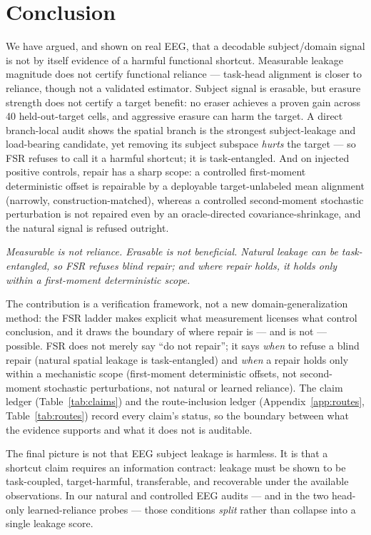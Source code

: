 \section{Conclusion}
\label{sec:conclusion}

We have argued, and shown on real EEG, that a decodable subject/domain signal is not by itself evidence
of a harmful functional shortcut. Measurable leakage magnitude does not certify functional reliance ---
task-head alignment is closer to reliance, though not a validated estimator. Subject signal is erasable,
but erasure strength does not certify a target benefit: no eraser achieves a proven gain across 40
held-out-target cells, and aggressive erasure can harm the target. A direct branch-local audit shows the
spatial branch is the strongest subject-leakage and load-bearing candidate, yet removing its subject
subspace \emph{hurts} the target --- so FSR refuses to call it a harmful shortcut; it is task-entangled.
And on injected positive controls, repair has a sharp scope: a controlled first-moment deterministic
offset is repairable by a deployable target-unlabeled mean alignment (narrowly, construction-matched),
whereas a controlled second-moment stochastic perturbation is not repaired even by an oracle-directed
covariance-shrinkage, and the natural signal is refused outright.

\begin{center}
\emph{Measurable is not reliance. Erasable is not beneficial. Natural leakage can be task-entangled, so
FSR refuses blind repair; and where repair holds, it holds only within a first-moment deterministic
scope.}
\end{center}

The contribution is a verification framework, not a new domain-generalization method: the FSR ladder
makes explicit what measurement licenses what control conclusion, and it draws the boundary of where
repair is --- and is not --- possible. FSR does not merely say ``do not repair''; it says \emph{when} to
refuse a blind repair (natural spatial leakage is task-entangled) and \emph{when} a repair holds only
within a mechanistic scope (first-moment deterministic offsets, not second-moment stochastic
perturbations, not natural or learned reliance). The claim ledger (Table~\ref{tab:claims}) and the
route-inclusion ledger (Appendix~\ref{app:routes}, Table~\ref{tab:routes}) record every claim's status,
so the boundary between what the evidence supports and what it does not is auditable.

The final picture is not that EEG subject leakage is harmless. It is that a shortcut claim requires an
information contract: leakage must be shown to be task-coupled, target-harmful, transferable, and
recoverable under the available observations. In our natural and controlled EEG audits --- and in the two
head-only learned-reliance probes --- those conditions \emph{split} rather than collapse into a single
leakage score.

\begin{table}[t]
\centering\small

\caption{Claim ledger. Statuses are derived from the frozen result artifacts, not hand-set.}
\label{tab:claims}
\end{table}
